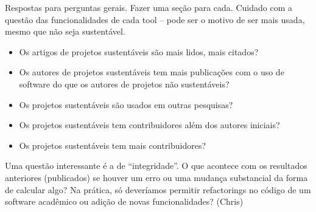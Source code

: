\label{discussao}


Respostas para perguntas gerais. Fazer uma seção para cada.
Cuidado com a questão das funcionalidades de cada tool -- pode ser o motivo de ser mais usada,
mesmo que não seja sustentável.


\begin{itemize}
  \item Os artigos de projetos sustentáveis são mais lidos, mais citados?
  \item Os autores de projetos sustentáveis tem mais publicações 
com o uso de software do que os autores de projetos não sustentáveis?
  \item Os projetos sustentáveis são usados em outras pesquisas?
  \item Os projetos sustentáveis tem contribuidores além dos autores iniciais?
  \item Os projetos sustentáveis tem mais contribuidores?
\end{itemize}

Uma questão interessante é a de ``integridade''. 
O que acontece com os resultados anteriores (publicados)
se houver um erro ou uma mudança substancial da forma de calcular algo?
Na prática, só deveríamos permitir refactorings no código 
de um software acadêmico ou adição de novas funcionalidades?
(Chris)

